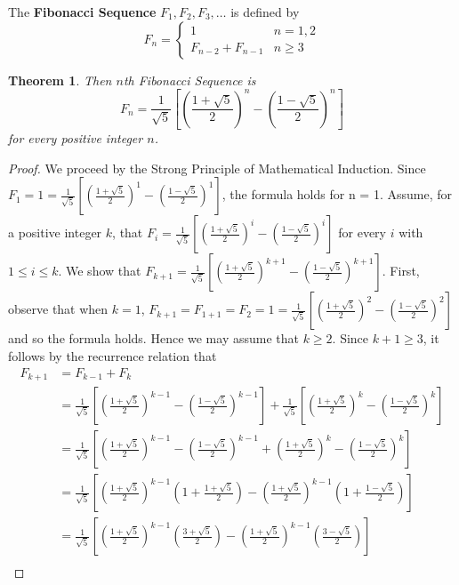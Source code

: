 \documentclass[11pt]{article}
\newtheorem{theorem}{Theorem}
\begin{document}
\newpage

\noindent The {\bf Fibonacci Sequence} $F_1, F_2, F_3, \dots$ is defined by 
\[F_n=\begin{cases}1& n=1,2\\F_{n-2}+F_{n-1}&n\ge 3\end{cases}\]

\begin{theorem}
Then $n$th Fibonacci Sequence is 
\[F_n=\frac{1}{\sqrt{5}}\left[\left(\frac{1+\sqrt{5}}{2}\right)^n-\left(\frac{1-\sqrt{5}}{2}\right)^n\right]\]
for every positive integer $n$.
\end{theorem}

\begin{proof}
	We proceed by the Strong Principle of Mathematical Induction. Since $F_1 = 1 = \frac{1}{\sqrt{5}}\left[\left(\frac{1+\sqrt{5}}{2}\right)^1-\left(\frac{1-\sqrt{5}}{2}\right)^1\right]$, the formula holds for n = 1. Assume, for a positive integer $k$, that $F_i = \frac{1}{\sqrt{5}}\left[\left(\frac{1+\sqrt{5}}{2}\right)^i-\left(\frac{1-\sqrt{5}}{2}\right)^i\right]$ for every $i$ with $1\le i\le k$. We show that $F_{k+1} = \frac{1}{\sqrt{5}}\left[\left(\frac{1+\sqrt{5}}{2}\right)^{k+1}-\left(\frac{1-\sqrt{5}}{2}\right)^{k+1}\right]$. First, observe that when $k=1$, $F_{k+1} = F_{1+1} = F_2 = 1 = \frac{1}{\sqrt{5}}\left[\left(\frac{1+\sqrt{5}}{2}\right)^2-\left(\frac{1-\sqrt{5}}{2}\right)^2\right]$ and so the formula holds. Hence we may assume that $k\ge2$. Since $k+1\ge3$, it follows by the recurrence relation that
	\begin{align}
		F_{k+1} &= F_{k-1}+F_k \\
		&= \frac{1}{\sqrt{5}}\left[\left(\frac{1+\sqrt{5}}{2}\right)^{k-1}-\left(\frac{1-\sqrt{5}}{2}\right)^{k-1}\right] + \frac{1}{\sqrt{5}}\left[\left(\frac{1+\sqrt{5}}{2}\right)^{k}-\left(\frac{1-\sqrt{5}}{2}\right)^{k}\right] \\
		&= \frac{1}{\sqrt{5}}\left[\left(\frac{1+\sqrt{5}}{2}\right)^{k-1}-\left(\frac{1-\sqrt{5}}{2}\right)^{k-1} + \left(\frac{1+\sqrt{5}}{2}\right)^{k}-\left(\frac{1-\sqrt{5}}{2}\right)^{k}\right] \\
		&= \frac{1}{\sqrt{5}}\left[\left(\frac{1+\sqrt{5}}{2}\right)^{k-1}\left(1+ \frac{1+\sqrt{5}}{2}\right) - \left(\frac{1+\sqrt{5}}{2}\right)^{k-1}\left(1+\frac{1-\sqrt{5}}{2}\right)\right] \\
		&= \frac{1}{\sqrt{5}}\left[\left(\frac{1+\sqrt{5}}{2}\right)^{k-1}\left(\frac{3+\sqrt{5}}{2}\right) - \left(\frac{1+\sqrt{5}}{2}\right)^{k-1}\left(\frac{3-\sqrt{5}}{2}\right)\right] \\

\end{align}
\end{proof}
\end{document}
